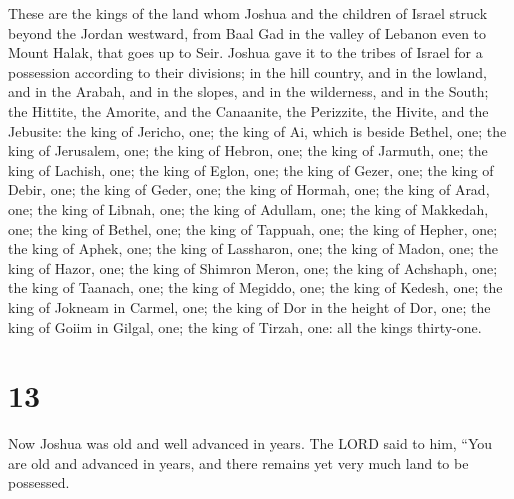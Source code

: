  These are the kings of the land whom Joshua and the
children of Israel struck beyond the Jordan westward, from Baal Gad in
the valley of Lebanon even to Mount Halak, that goes up to Seir. Joshua
gave it to the tribes of Israel for a possession according to their
divisions;  in the hill country, and in the lowland, and in
the Arabah, and in the slopes, and in the wilderness, and in the South;
the Hittite, the Amorite, and the Canaanite, the Perizzite, the Hivite,
and the Jebusite:  the king of Jericho, one; the king of Ai,
which is beside Bethel, one;  the king of Jerusalem, one;
the king of Hebron, one;  the king of Jarmuth, one; the
king of Lachish, one;  the king of Eglon, one; the king of
Gezer, one;  the king of Debir, one; the king of Geder,
one;  the king of Hormah, one; the king of Arad, one;
 the king of Libnah, one; the king of Adullam, one;
 the king of Makkedah, one; the king of Bethel, one;
 the king of Tappuah, one; the king of Hepher, one;
 the king of Aphek, one; the king of Lassharon, one;
 the king of Madon, one; the king of Hazor, one;
 the king of Shimron Meron, one; the king of Achshaph, one;
 the king of Taanach, one; the king of Megiddo, one;
 the king of Kedesh, one; the king of Jokneam in Carmel,
one;  the king of Dor in the height of Dor, one; the king
of Goiim in Gilgal, one;  the king of Tirzah, one: all the
kings thirty-one.

\hypertarget{section-12}{%
\section{13}\label{section-12}}

 Now Joshua was old and well advanced in years. The LORD
said to him, ``You are old and advanced in years, and there remains yet
very much land to be possessed.

